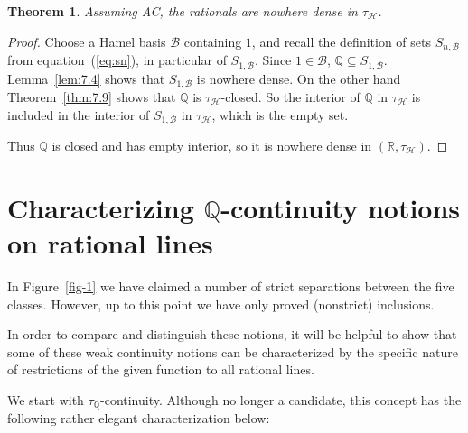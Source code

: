 \documentclass[11pt]{amsart} %
\newtheorem{theorem}{Theorem}[section]
\theoremstyle{definition}
\newcommand{\B}{\mathcal{B}}
\newcommand{\Q}{\mathbb{Q}}
\newcommand{\AD}{\mathcal{H}}
\begin{document}
\begin{theorem} Assuming AC,  
the rationals are nowhere dense in $\tau_{\AD}$. 
\end{theorem} 
\begin{proof} 



Choose a Hamel basis $\B$ containing $1$, and 
recall the definition of sets $S_{n,\B}$ from equation~(\ref{eq:sn}), in particular of $S_{1,\B}$. Since $1\in \B$, $\Q\subseteq S_{1,\B}$. Lemma~\ref{lem:7.4} shows that $S_{1,\B}$ is nowhere dense. On the other hand Theorem~\ref{thm:7.9} shows that $\Q$ is $\tau_{\AD}$-closed. So the interior of $\Q$ in $\tau_{\AD}$ is included in the interior of $S_{1,\B}$ in $\tau_{\AD}$, which is the empty set. 

Thus $\mathbb Q$ is closed and has empty interior, so it is nowhere dense in $(\mathbb R,\tau_{\AD})$.
\end{proof} 




\section{Characterizing $\Q$-continuity notions on rational lines}
\label{sec:4} 

In Figure~\ref{fig-1} we have claimed a number of strict separations between the five classes. However, up to this point we have only proved (nonstrict) inclusions. 

In order to compare and distinguish these notions, it will be helpful to show that some of these weak continuity notions can be characterized by the specific nature of restrictions of the given function to all rational lines. 

We start with $\tau_{\Q}$-continuity. Although no longer a candidate, this concept has the following rather elegant characterization below: 
\end{document}
